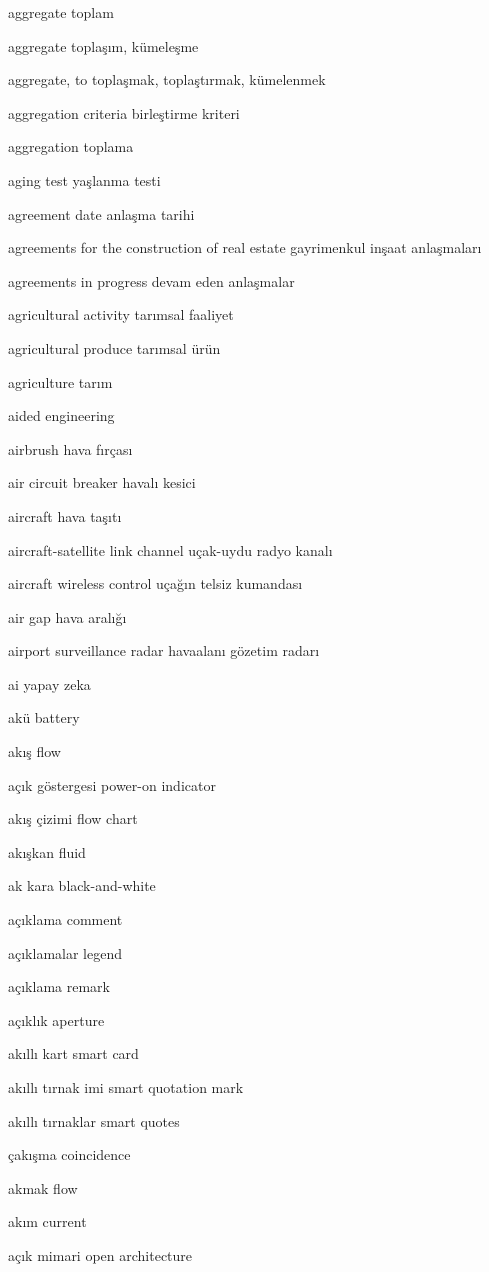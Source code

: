 \documentclass[12pt,fleqn]{article}\usepackage{../../common}
\begin{document}
aggregate toplam

aggregate toplaşım, kümeleşme

aggregate, to toplaşmak, toplaştırmak, kümelenmek

aggregation criteria birleştirme kriteri

aggregation toplama

aging test yaşlanma testi

agreement date anlaşma tarihi

agreements for the construction of real estate gayrimenkul inşaat anlaşmaları

agreements in progress devam eden anlaşmalar

agricultural activity tarımsal faaliyet

agricultural produce tarımsal ürün

agriculture tarım

aided engineering

airbrush hava fırçası

air circuit breaker havalı kesici

aircraft hava taşıtı

aircraft-satellite link channel uçak-uydu radyo kanalı

aircraft wireless control uçağın telsiz kumandası

air gap hava aralığı

airport surveillance radar havaalanı gözetim radarı

ai yapay zeka

akü battery

akış flow

açık göstergesi power-on indicator

akış çizimi flow chart

akışkan fluid

ak kara black-and-white

açıklama comment

açıklamalar legend

açıklama remark

açıklık aperture

akıllı kart smart card

akıllı tırnak imi smart quotation mark

akıllı tırnaklar smart quotes

çakışma coincidence

akmak flow

akım current

açık mimari open architecture
\end{document}
